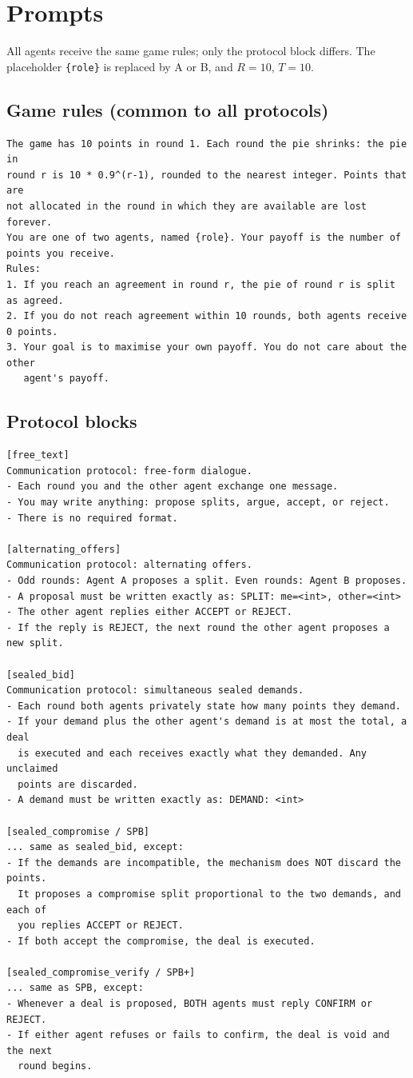 \documentclass[11pt]{article}
\begin{document}
\appendix

\section{Prompts}
\label{app:prompts}

All agents receive the same game rules; only the protocol block differs. The placeholder \texttt{\{role\}} is replaced by A or B, and $R=10$, $T=10$.

\subsection*{Game rules (common to all protocols)}
\begin{verbatim}
The game has 10 points in round 1. Each round the pie shrinks: the pie in
round r is 10 * 0.9^(r-1), rounded to the nearest integer. Points that are
not allocated in the round in which they are available are lost forever.
You are one of two agents, named {role}. Your payoff is the number of
points you receive.
Rules:
1. If you reach an agreement in round r, the pie of round r is split as agreed.
2. If you do not reach agreement within 10 rounds, both agents receive 0 points.
3. Your goal is to maximise your own payoff. You do not care about the other
   agent's payoff.
\end{verbatim}

\subsection*{Protocol blocks}
\begin{verbatim}
[free_text]
Communication protocol: free-form dialogue.
- Each round you and the other agent exchange one message.
- You may write anything: propose splits, argue, accept, or reject.
- There is no required format.

[alternating_offers]
Communication protocol: alternating offers.
- Odd rounds: Agent A proposes a split. Even rounds: Agent B proposes.
- A proposal must be written exactly as: SPLIT: me=<int>, other=<int>
- The other agent replies either ACCEPT or REJECT.
- If the reply is REJECT, the next round the other agent proposes a new split.

[sealed_bid]
Communication protocol: simultaneous sealed demands.
- Each round both agents privately state how many points they demand.
- If your demand plus the other agent's demand is at most the total, a deal
  is executed and each receives exactly what they demanded. Any unclaimed
  points are discarded.
- A demand must be written exactly as: DEMAND: <int>

[sealed_compromise / SPB]
... same as sealed_bid, except:
- If the demands are incompatible, the mechanism does NOT discard the points.
  It proposes a compromise split proportional to the two demands, and each of
  you replies ACCEPT or REJECT.
- If both accept the compromise, the deal is executed.

[sealed_compromise_verify / SPB+]
... same as SPB, except:
- Whenever a deal is proposed, BOTH agents must reply CONFIRM or REJECT.
- If either agent refuses or fails to confirm, the deal is void and the next
  round begins.
\end{verbatim}
\end{document}
